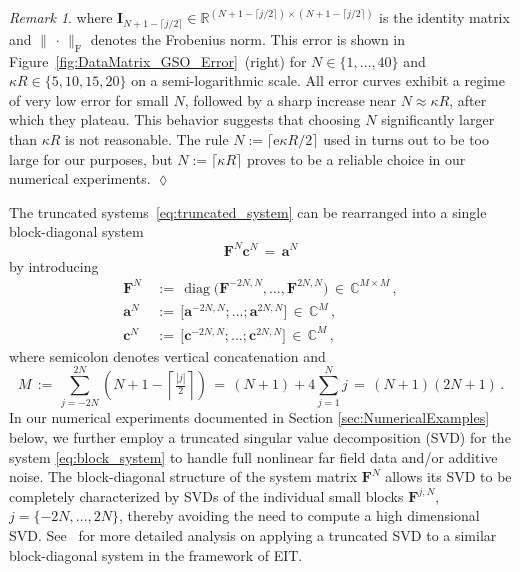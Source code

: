 \documentclass[11pt,a4paper]{article}
\theoremstyle{definition}
\theoremstyle{remark} \newtheorem{remark}[theorem]{Remark}
\numberwithin{equation}{section}
\numberwithin{figure}{section}
\numberwithin{algorithm}{section}
\numberwithin{table}{section}
\newcommand{\field}[1]{{\mathbb{#1}}}
\newcommand{\C}{\field{C}}
\newcommand{\R}{\field{R}}
\newcommand{\bs}{\boldsymbol}
\newcommand{\bfa}{{\bs a}}
\newcommand{\bfc}{{\bs c}}
\newcommand{\bfF}{{\bs F}}
\newcommand{\bfI}{{\bs I}}
\newcommand{\rme}{\mathrm{e}}
\newcommand{\ph}{\,\cdot\,}
\DeclareMathOperator{\diag}{diag}
\begin{document}
\begin{remark}
    where $\bfI_{N+1-\lceil j/2\rceil}\in\R^{(N+1-\lceil j/2\rceil)\times (N+1-\lceil j/2\rceil)}$ is the identity matrix and $\|\ph\|_{\mathrm F}$ denotes the Frobenius norm.
    This error is shown in Figure~\ref{fig:DataMatrix_GSO_Error}~(right) for $N\in\{1,\ldots,40\}$ and $\kappa R\in\{5,10,15,20\}$ on a semi-logarithmic scale.
    All error curves exhibit a regime of very low error for small $N$, followed by a sharp increase near $N \approx \kappa R$, after which they plateau.
    This behavior suggests that choosing $N$ significantly larger than $\kappa R$ is not reasonable.
    The rule $N:=\lceil \rme\kappa R/2\rceil$ used in \cite{GriSch24} turns out to be too large for our purposes, but $N:=\lceil\kappa R\rceil$ proves to be a reliable choice in our numerical experiments.
    \hfill$\lozenge$
\end{remark}

The truncated systems~\eqref{eq:truncated_system} can be rearranged into a single block-diagonal system
\begin{equation}
\label{eq:block_system}
	\bfF^N \bfc^N \,=\, \bfa^N
\end{equation}
by introducing
\begin{align*}
\bfF^N \,&:=\, \diag \!\big(\bfF^{-2N,N},\ldots,\bfF^{2N,N} \big) \,\in\, \C^{M\times M}\,,  \\[1mm]
	\bfa^N \,&:=\, \big[\bfa^{-2N,N}; \ldots;\bfa^{2N,N}\big] \,\in\, \C^M\,, \\[1mm]
	\bfc^N \,&:=\, \big[\bfc^{-2N,N};\ldots ;\bfc^{2N,N} \big] \,\in\, \C^M\,,
\end{align*}
where semicolon denotes vertical concatenation and 
\begin{equation*}
	M \,:=\, \sum_{j=-2N}^{2N} \left(N+1-\left\lceil\tfrac{|j|} 2\right\rceil\right)
	\,=\, (N+1)+4 \sum_{j=1}^N j
	\,=\, (N+1)(2N+1)\,.
\end{equation*}
In our numerical experiments documented in Section \ref{sec:NumericalExamples} below, we further employ a truncated singular value decomposition (SVD) for the system \eqref{eq:block_system} to handle full nonlinear far field data and/or additive noise.
The block-diagonal structure of the system matrix $\bfF^N$ allows its SVD to be completely characterized by SVDs of the individual small blocks $\bfF^{j,N}$, $j=\{-2N,\ldots,2N\}$, thereby avoiding the need to compute a high dimensional SVD. See~\cite{AutGarHirHvy24} for more detailed analysis on applying a truncated SVD to a similar block-diagonal system in the framework of EIT. 
\end{document}
